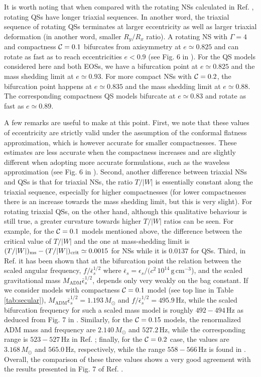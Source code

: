 \documentclass[twocolumn,superscriptaddress,showpacs,prd,aps,amsmath,amssymb,nofootinbib]{revtex4-1}
\begin{document}
It is worth noting that when compared with the rotating NSs calculated in
Ref. \cite{Uryu2016a}, rotating QSs have longer triaxial sequences. In
another word, the triaxial sequence of rotating QSs terminates at larger
eccentricity as well as larger triaxial deformation (in another word,
smaller $R_y/R_x$ ratio).  A rotating NS with $\Gamma=4$ and compactness
$\mathcal{C}=0.1$ bifurcates from axisymmetry at $e\simeq 0.825$ and can
rotate as fast as to reach eccentricities $e< 0.9$ (see Fig. 6 in
\cite{Uryu2016a}). For the QS models considered here and both
EOSs, we have a bifurcation point at $e\simeq 0.825$
and the mass shedding limit at $e\simeq 0.93$. For more compact NSs with
$\mathcal{C}=0.2$, the bifurcation point happens at $e\simeq 0.835$ and the
mass shedding limit at $e\simeq 0.88$. The corresponding compactness QS
models bifurcate at $e\simeq 0.83$ and rotate as fast as $e\simeq 0.89$.

A few remarks are useful to make at this point. First, we note that these
values of eccentricity are strictly valid under the
assumption of the conformal flatness approximation, which is however
accurate for smaller compactnesses. These estimates are
less accurate when the compactness increases
and are slightly different when adopting more accurate
formulations, such as the waveless approximation (see Fig. 6 in
\cite{Uryu2016a}). Second, another difference between triaxial NSs and
QSs is that for triaxial NSs, the ratio $T/|W|$ is essentially constant
along the triaxial sequence, especially for higher compactnesses (for
lower compactnesses there is an increase towards the mass shedding limit,
but this is very slight). For rotating triaxial QSs, on the other hand,
although this qualitative behaviour is still true, a greater curvature
towards higher $T/|W|$ ratios can be seen. For example, for the
$\mathcal{C}=0.1$ models mentioned above, the difference between the critical
value of $T/|W|$ and the one at mass-shedding limit is $(T/|W|)_{\rm
  ms}-(T/|W|)_{\rm crit}\simeq 0.0015$ for NSs while it is $0.0137$ for
QSs. Third, in Ref. \cite{rosinska2003} it has been shown that at the
bifurcation point the relation between the scaled angular frequency,
$f/\bar{\epsilon}_s^{1/2}$ where $\bar{\epsilon}_s = \epsilon_s/(c^2\,
10^{14}\,\mathrm{g\,cm^{-3}}$), and the scaled gravitational mass
$M_\mathrm{ADM}\bar{\epsilon}_s^{1/2}$, depends only very weakly on the
bag constant. If we consider models with compactness $\mathcal{C}=0.1$ model
(see top line in Table \ref{tab:secular}),
$M_\mathrm{ADM}\bar{\epsilon}_s^{1/2} = 1.193\,M_\odot$ and $f/
\bar{\epsilon}_s^{1/2} = 495.9\,\mathrm{Hz}$, while the scaled
bifurcation frequency for such a scaled mass model is roughly
$492-494\,\mathrm{Hz}$ as deduced from Fig. 7 in \cite{rosinska2003}.
Similarly, for the $\mathcal{C}=0.15$ models, the renormalized ADM mass and
frequency are $2.140\,M_\odot$ and $527.2\,\mathrm{Hz}$, while the
corresponding range is $523-527\,\mathrm{Hz}$ in
Ref. \cite{rosinska2003}; finally, for the $\mathcal{C}=0.2$ case, the values
are $3.168\,M_\odot$ and $565.0\,\mathrm{Hz}$, respectively, while the
range $558-566\,\mathrm{Hz}$ is found in \cite{rosinska2003}.  Overall,
the comparison of these three values shows a very good agreement with the
results presented in Fig. 7 of Ref. \cite{rosinska2003}.
\end{document}
